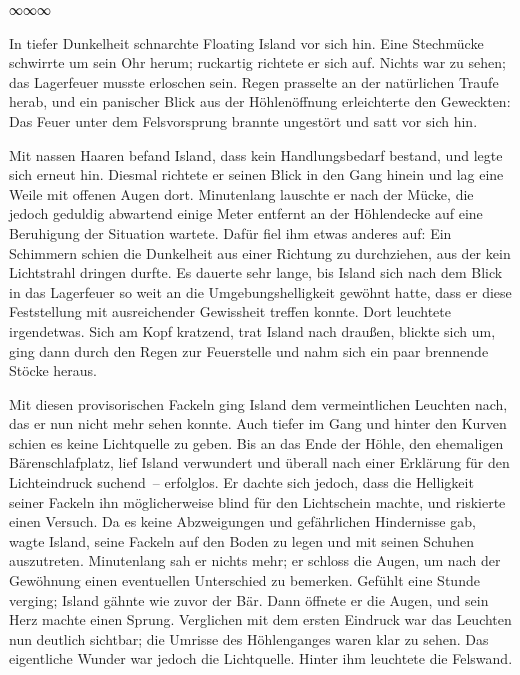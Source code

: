 \begin{center}
∞∞∞
\end{center}

In tiefer Dunkelheit schnarchte Floating Island vor sich hin. Eine Stechmücke schwirrte um sein Ohr herum; ruckartig richtete er sich auf. Nichts war zu sehen; das Lagerfeuer musste erloschen sein. Regen prasselte an der natürlichen Traufe herab, und ein panischer Blick aus der Höhlenöffnung erleichterte den Geweckten: Das Feuer unter dem Felsvorsprung brannte ungestört und satt vor sich hin.

Mit nassen Haaren befand Island, dass kein Handlungsbedarf bestand, und legte sich erneut hin. Diesmal richtete er seinen Blick in den Gang hinein und lag eine Weile mit offenen Augen dort. Minutenlang lauschte er nach der Mücke, die jedoch geduldig abwartend einige Meter entfernt an der Höhlendecke auf eine Beruhigung der Situation wartete. Dafür fiel ihm etwas anderes auf: Ein Schimmern schien die Dunkelheit aus einer Richtung zu durchziehen, aus der kein Lichtstrahl dringen durfte. Es dauerte sehr lange, bis Island sich nach dem Blick in das Lagerfeuer so weit an die Umgebungshelligkeit gewöhnt hatte, dass er diese Feststellung mit ausreichender Gewissheit treffen konnte. Dort leuchtete irgendetwas. Sich am Kopf kratzend, trat Island nach draußen, blickte sich um, ging dann durch den Regen zur Feuerstelle und nahm sich ein paar brennende Stöcke heraus.

Mit diesen provisorischen Fackeln ging Island dem vermeintlichen Leuchten nach, das er nun nicht mehr sehen konnte. Auch tiefer im Gang und hinter den Kurven schien es keine Lichtquelle zu geben. Bis an das Ende der Höhle, den ehemaligen Bärenschlafplatz, lief Island verwundert und überall nach einer Erklärung für den Lichteindruck suchend~– erfolglos. Er dachte sich jedoch, dass die Helligkeit seiner Fackeln ihn möglicherweise blind für den Lichtschein machte, und riskierte einen Versuch. Da es keine Abzweigungen und gefährlichen Hindernisse gab, wagte Island, seine Fackeln auf den Boden zu legen und mit seinen Schuhen auszutreten. Minutenlang sah er nichts mehr; er schloss die Augen, um nach der Gewöhnung einen eventuellen Unterschied zu bemerken. Gefühlt eine Stunde verging; Island gähnte wie zuvor der Bär. Dann öffnete er die Augen, und sein Herz machte einen Sprung. Verglichen mit dem ersten Eindruck war das Leuchten nun deutlich sichtbar; die Umrisse des Höhlenganges waren klar zu sehen. Das eigentliche Wunder war jedoch die Lichtquelle. Hinter ihm leuchtete die Felswand.

